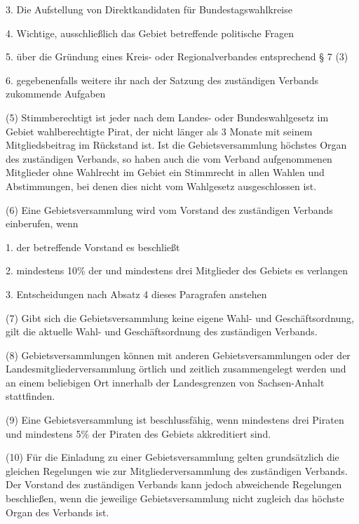 {3. Die Aufstellung von Direktkandidaten für Bundestagswahlkreise

4. Wichtige, ausschließlich das Gebiet betreffende politische Fragen

5. über die Gründung eines Kreis- oder Regionalverbandes entsprechend § 7 (3)

6. gegebenenfalls weitere ihr nach der Satzung des zuständigen Verbands zukommende Aufgaben

(5) Stimmberechtigt ist jeder nach dem Landes- oder Bundeswahlgesetz im Gebiet wahlberechtigte Pirat, der nicht länger als 3 Monate mit seinem Mitgliedsbeitrag im Rückstand ist. Ist die Gebietsversammlung höchstes Organ des zuständigen Verbands, so haben auch die vom Verband aufgenommenen Mitglieder ohne Wahlrecht im Gebiet ein Stimmrecht in allen Wahlen und Abstimmungen, bei denen dies nicht vom Wahlgesetz ausgeschlossen ist.

(6) Eine Gebietsversammlung wird vom Vorstand des zuständigen Verbands einberufen, wenn

1. der betreffende Vorstand es beschließt

2. mindestens 10\% der und mindestens drei Mitglieder des Gebiets es verlangen

3. Entscheidungen nach Absatz 4 dieses Paragrafen anstehen

(7) Gibt sich die Gebietsversammlung keine eigene Wahl- und Geschäftsordnung, gilt die aktuelle Wahl- und Geschäftsordnung des zuständigen Verbands.

(8) Gebietsversammlungen können mit anderen Gebietsversammlungen oder der Landesmitgliederversammlung örtlich und zeitlich zusammengelegt werden und an einem beliebigen Ort innerhalb der Landesgrenzen von Sachsen-Anhalt stattfinden.

(9) Eine Gebietsversammlung ist beschlussfähig, wenn mindestens drei Piraten und mindestens 5\% der Piraten des Gebiets akkreditiert sind.

(10) Für die Einladung zu einer Gebietsversammlung gelten grundsätzlich die gleichen Regelungen wie zur Mitgliederversammlung des zuständigen Verbands. Der Vorstand des zuständigen Verbands kann jedoch abweichende Regelungen beschließen, wenn die jeweilige Gebietsversammlung nicht zugleich das höchste Organ des Verbands ist.}

